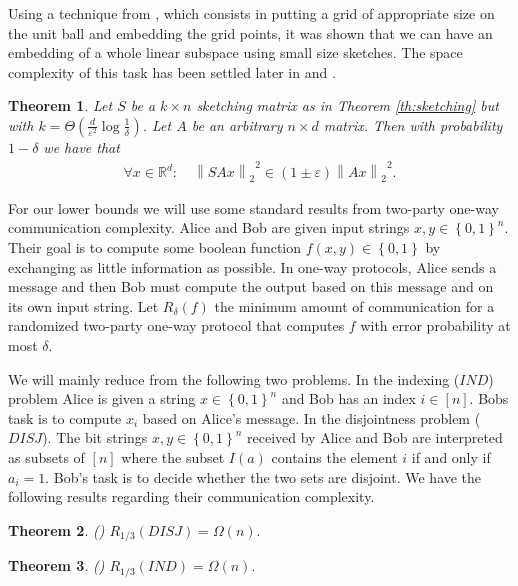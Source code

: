 \documentclass[a4paper,11pt,oneside,english,onecolumn]{article}
\newtheorem{theorem}{Theorem}
\theoremstyle{definition}
\newcommand{\br}[1]{\left\{#1\right\}}                            \renewcommand{\Pr}[1]{\ensuremath{\mathbf{Pr}\left[#1\right]}}
\newcommand{\norm}[1]{\ensuremath{\left\| #1\right\|_2}}
\newcommand{\REAL}{\ensuremath{\mathbb{R}}}
\newcommand{\eps}{\ensuremath{\varepsilon}}
\begin{document}
Using a technique from \cite{ImpLinAlg}, which consists in putting a grid of appropriate size on the unit ball and embedding the grid points, it was shown that we can have an embedding of a whole linear subspace using small size sketches. The space complexity of this task has been settled later in \cite{LinAlgStream} and \cite{NelsonN14}.
\begin{theorem}
\label{th:embedding}
Let $S$ be a $k \times n$ sketching  matrix as in Theorem \ref{th:sketching} but with $k = \Theta(\frac{d}{\eps^2}\log{\frac{1}{\delta}})$. Let $A$ be an arbitrary $n \times d$ matrix. Then with probability $1 - \delta$ we have that
\begin{align*}
\forall x \in \REAL^d: \quad \norm{SAx}^2 \in (1 \pm \eps) \norm{Ax}^2.
\end{align*}
\end{theorem}

For our lower bounds we will use some standard results from two-party one-way communication complexity. Alice and Bob are given input strings $x, y \in \br{0,1}^n$. Their goal is to compute some boolean function $f(x,y) \in \br{0,1}$ by exchanging as little information as possible. In one-way protocols, Alice sends a message and then Bob must compute the output based on this message and on its own input string. Let $R_\delta(f)$ the minimum amount of communication for a randomized two-party one-way protocol that computes $f$ with error probability at most $\delta$.

We will mainly reduce from the following two problems. In the indexing ($IND$) problem Alice is given a string $x\in\br{0,1}^n$ and Bob has an index $i \in [n]$. Bobs task is to compute $x_i$ based on Alice's message. In the disjointness problem ($DISJ$). The bit strings $x, y \in \br{0,1}^n$ received by Alice and Bob are interpreted as subsets of $[n]$ where the subset $I(a)$ contains the element $i$ if and only if $a_i=1$. Bob's task is to decide whether the two sets are disjoint. We have the following results regarding their communication complexity.

\begin{theorem}(\cite{Disjointness})
\label{th:disjointness}
$R_{1/3}(DISJ) = \Omega(n).$
\end{theorem}

\begin{theorem}(\cite{CommComplexity})
\label{th:indexing}
$R_{1/3}(IND) = \Omega(n).$
\end{theorem}
\end{document}
